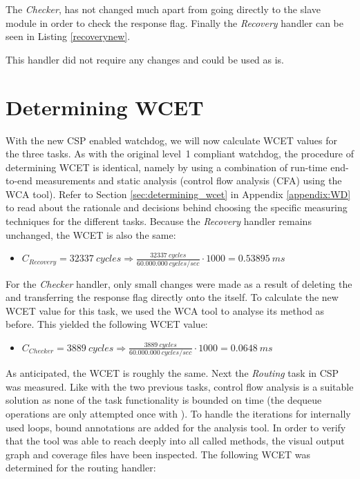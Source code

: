 

The \textit{Checker}, has not changed much apart from going directly to the slave module in order to check the response flag. Finally the \textit{Recovery} handler can be seen in Listing \ref{recoverynew}.



This handler did not require any changes and could be used as is.

\section{Determining WCET}
With the new CSP enabled watchdog, we will now calculate WCET values for the three tasks. As with the original level~1 compliant watchdog, the procedure of determining WCET is identical, namely by using a combination of run-time end-to-end measurements and static analysis (control flow analysis (CFA) using the WCA tool). Refer to Section \ref{sec:determining_wcet} in Appendix \ref{appendix:WD} to read about the rationale and decisions behind choosing the specific measuring techniques for the different tasks. Because the \textit{Recovery} handler remains unchanged, the WCET is also the same:

\begin{itemize}
	\item $C_{Recovery} = 32337\ cycles \Rightarrow \frac{32337\ cycles}{60.000.000\ cycles/sec} \cdot 1000 = 0.53895\ ms$
\end{itemize}

For the \textit{Checker} handler, only small changes were made as a result of deleting the  and transferring the response flag directly onto the  itself. To calculate the new WCET value for this task, we used the WCA tool to analyse its  method as before. This yielded the following WCET value:

\begin{itemize}
	\item $C_{Checker} = 3889\ cycles \Rightarrow \frac{3889\ cycles}{60.000.000\ cycles/sec} \cdot 1000 = 0.0648\ ms$
\end{itemize}

As anticipated, the WCET is roughly the same. Next the \textit{Routing} task in CSP was measured. Like with the two previous tasks, control flow analysis is a suitable solution as none of the task functionality is bounded on time (the dequeue operations are only attempted once with ). To handle the iterations for internally used loops, bound annotations are added for the analysis tool. In order to verify that the tool was able to reach deeply into all called methods, the visual output graph and coverage files have been inspected. The following WCET was determined for the routing handler:

